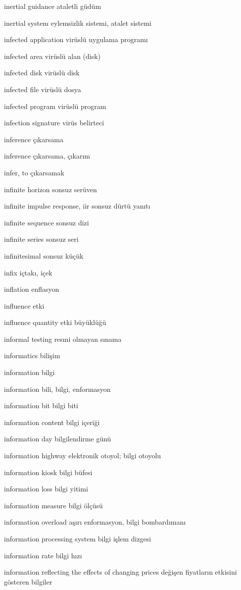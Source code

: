 \documentclass[12pt,fleqn]{article}\usepackage{../../common}
\begin{document}
inertial guidance ataletli güdüm

inertial system eylemsizlik sistemi, atalet sistemi

infected application virüslü uygulama programı

infected area virüslü alan (disk)

infected disk virüslü disk

infected file virüslü dosya

infected program virüslü program

infection signature virüs belirteci

inference çıkarsama

inference çıkarsama, çıkarım

infer, to çıkarsamak

infinite horizon sonsuz serüven

infinite impulse response, iir sonsuz dürtü yanıtı

infinite sequence sonsuz dizi

infinite series sonsuz seri

infinitesimal sonsuz küçük

infix içtakı, içek

inflation enflasyon

influence etki

influence quantity etki büyüklüğü

informal testing resmi olmayan sınama

informatics bilişim

information bilgi

information bili, bilgi, enformasyon

information bit bilgi biti

information content bilgi içeriği

information day bilgilendirme günü

information highway elektronik otoyol; bilgi otoyolu

information kiosk bilgi büfesi

information loss bilgi yitimi

information measure bilgi ölçüsü

information overload aşırı enformasyon, bilgi bombardımanı

information processing system bilgi işlem dizgesi

information rate bilgi hızı

information reflecting the effects of changing prices değişen fiyatların etkisini gösteren bilgiler
\end{document}
